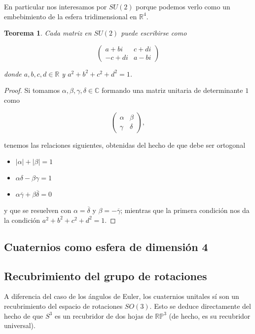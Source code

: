 \documentclass{article}
\theoremstyle{plain}
\newtheorem{theorem}{Teorema}
\theoremstyle{definition}
\theoremstyle{remark}
\begin{document}
En particular nos interesamos por $SU(2)$ porque podemos verlo como un embebimiento de la
esfera tridimensional en $\mathbb{R}^4$.

\begin{theorem}
  Cada matriz en $SU(2)$ puede escribirse como

  \[\begin{pmatrix}
      a+bi & c+di \\
      -c+di & a-bi
    \end{pmatrix}\]

  donde $a,b,c,d \in \mathbb{R}$ y $a^2+b^2+c^2+d^2 = 1$.
\end{theorem}
\begin{proof}
  Si tomamos $\alpha,\beta,\gamma,\delta \in \mathbb{C}$ formando una matriz unitaria de
  determinante $1$ como

    \[\begin{pmatrix}
      \alpha & \beta \\
      \gamma & \delta
    \end{pmatrix},\]

  tenemos las relaciones siguientes, obtenidas del hecho de que debe ser ortogonal

  \begin{itemize}
    \item $|\alpha|+|\beta| = 1$
    \item $\alpha\delta-\beta\gamma = 1$
    \item $\alpha\overline{\gamma} + \beta\overline{\delta} = 0$
  \end{itemize}

  y que se resuelven con $\alpha = \overline{\delta}$ y
  $\beta = -\overline{\gamma}$; mientras que la primera condición
  nos da la condición $a^2+b^2+c^2+d^2 = 1$.
\end{proof}


\subsection{Cuaternios como esfera de dimensión 4}


\subsection{Recubrimiento del grupo de rotaciones}

A diferencia del caso de los ángulos de Euler, los cuaternios unitales
sí son un recubrimiento del espacio de rotaciones $SO(3)$. Esto se
deduce directamente del hecho de que $S^3$ es un recubridor de dos
hojas de $\mathbb{RP}^3$ (de hecho, es su recubridor universal).
\end{document}
